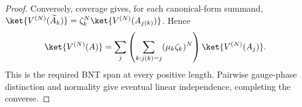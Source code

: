 \begin{proof}
    Conversely, coverage gives, for each canonical-form summand,
    $\ket{V^{(N)}(\widetilde A_k)}
        =\zeta_k^N\ket{V^{(N)}(A_{j(k)})}$. Hence
    \begin{align}
        \ket{V^{(N)}(A)}
         & = \sum_j
        \left(\sum_{k:j(k)=j}(\mu_k\zeta_k)^N\right)
        \ket{V^{(N)}(A_j)}.
        \notag
    \end{align}
    This is the required BNT span at every positive length. Pairwise
    gauge-phase distinction and normality give eventual linear independence,
    completing the converse.
\end{proof}

